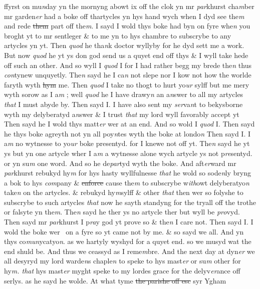 \documentclass[12pt, a4paper]{book}
\begin{document}
            		
		\ifthenelse{\isodd{\thepage}}
		{\reversemarginpar}
		{\normalmarginpar}
		ffyrst on mu\textit{n}day yn the mornyng abowt ix off the clok yn mr \textit{par}khurst cha\textit{m}ber mr
garden\textit{er} had a boke off thartycles yn hys hand wych when I dyd see the\textit{m} and
rede \sout{them }part off the\textit{m}. I sayd I wold thys boke had byn on fyre whe\textit{n} you broght yt
to mr sentleger \& to me yn to hys chambre to subscrybe to any artycles yn yt. Then 
\textit{quod} he tha\textit{n}k doctor wyllyby for he dyd sett me a work. But now \textit{quod} he yt ys don 
god send us a quyet end off thys \& I wyll take hede off such an other. And so wyll I \textit{quod} I
for I had rather begg my brede the\textit{n} thus \textit{con}tynew unquyetly. The\textit{n} sayd he I ca\textit{n} not 
slepe nor I kow not how the worlde faryth wyth \sout{hym }me. Then \textit{quod} I take no thogt to
hurt yo\textit{ur} sylff but me mery wyth sorow as I a\textit{m} ; well \textit{quod} he I have drawy\textit{n} an a\textit{n}swer
to all my artycles \textit{that} I must abyde by. Then sayd I. I have also sent my \textit{ser}va\textit{n}t to 
bekysborne wyth my delyberatyd a\textit{n}swer \& I trust \textit{that} my lord wyll favorably accept yt
Then sayd he I wold thys matt\textit{er} wer at an end. And so wold I \textit{quod} I. Then sayd he 
thys boke agreyth not yn all poy\textit{n}tes wyth the boke at londo\textit{n} Then sayd I. I a\textit{m} no wytnesse
to yo\textit{ur} boke presentyd. for I knewe not off yt. The\textit{n} sayd he yt ys but yn one artycle wher 
I a\textit{m} a wytnesse alone wych artycle ys not p\textit{re}sentyd. or yn su\textit{m} one word. And so he 
de\textit{par}tyd wyth the boke. And aft\textit{er}ward mr \textit{par}khurst rebukyd hy\textit{m} for hys hasty wyllfulnesse
\textit{that} he wold so sode\textit{n}ly bryng a bok to hys \textit{com}pany \& \sout{enforce }cause the\textit{m} to subscrybe w\textit{ith}owt
delyberatyo\textit{n} take\textit{n} on the artycles. \& rebukyd hy\textit{m}sylff \& other \textit{that} then wer so folyshe 
to subscrybe to such artycles \textit{that} now he sayth standyng for the tryall off the trothe or
falsyte yn the\textit{m}. The\textit{n} sayd he ther ys no artycle ther but wyll be \textit{pro}vyd. Then sayd
mr \textit{par}khurst I p\textit{ra}y god yt prove so \& the\textit{n} I care not. Then sayd I. I wold the boke wer 
on a fyre so yt came not by me. \& so sayd we all. And yn thys co\textit{mun}ycatyo\textit{n}. as we
hartyly wyshyd for a quyet end. so we musyd wat the end shuld be. And thus we
ceassyd as I reme\textit{m}bre. And the next day at dyn\textit{er} we all desyryd my lord warde\textit{n}s
chaple\textit{n} to speke to hys mast\textit{er} or su\textit{m} other for hy\textit{m. that }hys mast\textit{er} myght speke to my lordes grace 
for the delyv\textit{er}ance off serlys. as he sayd he wolde. At what tyme \sout{the parishe off esc}
               syr Ygham
			
\end{document}
